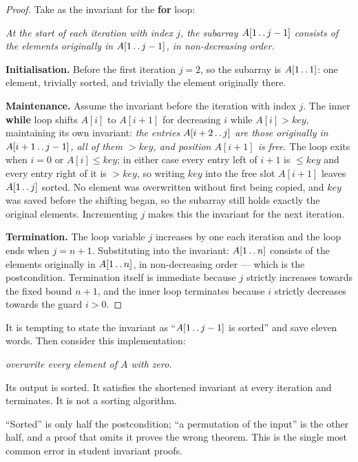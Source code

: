 \begin{proof}
Take as the invariant for the \textbf{for} loop:

\smallskip
\noindent\textit{At the start of each iteration with index $j$, the subarray
$A[1 \mathinner{\ldotp\ldotp} j-1]$ consists of the elements originally in
$A[1 \mathinner{\ldotp\ldotp} j-1]$, in non-decreasing order.}

\smallskip
\textbf{Initialisation.} Before the first iteration $j = 2$, so the subarray is
$A[1 \mathinner{\ldotp\ldotp} 1]$: one element, trivially sorted, and trivially
the element originally there.

\smallskip
\textbf{Maintenance.} Assume the invariant before the iteration with index $j$.
The inner \textbf{while} loop shifts $A[i]$ to $A[i+1]$ for decreasing $i$ while
$A[i] > \mathit{key}$, maintaining its own invariant: \emph{the entries
$A[i+2 \mathinner{\ldotp\ldotp} j]$ are those originally in
$A[i+1 \mathinner{\ldotp\ldotp} j-1]$, all of them $> \mathit{key}$, and
position $A[i+1]$ is free.} The loop exits when $i = 0$ or
$A[i] \le \mathit{key}$; in either case every entry left of $i+1$ is
$\le \mathit{key}$ and every entry right of it is $> \mathit{key}$, so writing
$\mathit{key}$ into the free slot $A[i+1]$ leaves
$A[1 \mathinner{\ldotp\ldotp} j]$ sorted. No element was overwritten without
first being copied, and $\mathit{key}$ was saved before the shifting began, so
the subarray still holds exactly the original elements. Incrementing $j$ makes
this the invariant for the next iteration.

\smallskip
\textbf{Termination.} The loop variable $j$ increases by one each iteration and
the loop ends when $j = n+1$. Substituting into the invariant: $A[1
\mathinner{\ldotp\ldotp} n]$ consists of the elements originally in $A[1
\mathinner{\ldotp\ldotp} n]$, in non-decreasing order --- which is the
postcondition. Termination itself is immediate because $j$ strictly increases
towards the fixed bound $n+1$, and the inner loop terminates because $i$
strictly decreases towards the guard $i > 0$.
\end{proof}

\begin{alertbox}
It is tempting to state the invariant as ``$A[1\mathinner{\ldotp\ldotp}j-1]$ is
sorted'' and save eleven words. Then consider this implementation:
\begin{center}
\emph{overwrite every element of $A$ with zero.}
\end{center}
Its output is sorted. It satisfies the shortened invariant at every iteration
and terminates. It is not a sorting algorithm.

\smallskip
``Sorted'' is only half the postcondition; ``a permutation of the input'' is the
other half, and a proof that omits it proves the wrong theorem. This is the
single most common error in student invariant proofs.
\end{alertbox}


